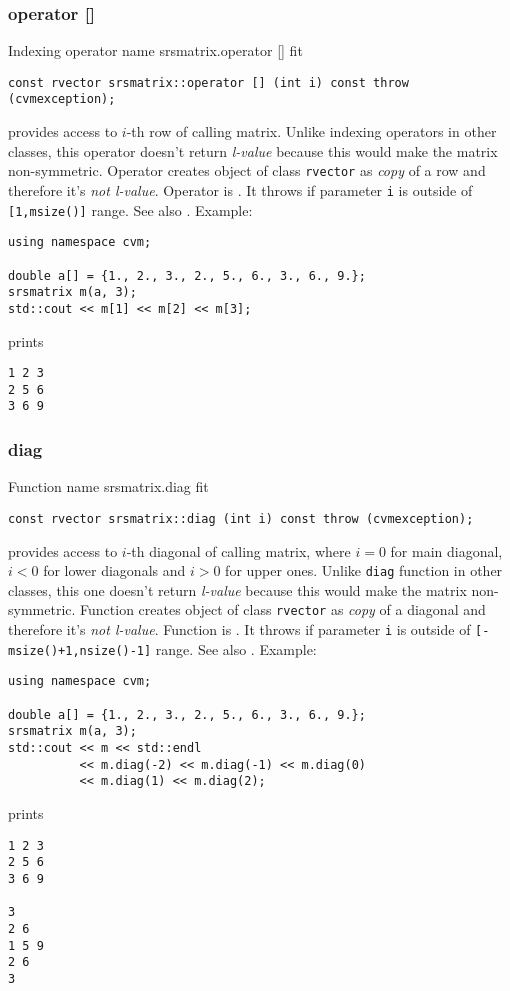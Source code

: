 \subsubsection{operator []}
Indexing operator%
\pdfdest name {srsmatrix.operator []} fit
\begin{verbatim}
const rvector srsmatrix::operator [] (int i) const throw (cvmexception);
\end{verbatim}
provides access to \hbox{$i$-th} row of calling matrix.
Unlike indexing operators in other classes,
this operator doesn't return  \emph{l-value}
because this would make the matrix non-symmetric.
Operator creates  object of class \verb"rvector"
as  \emph{copy} of a row and therefore it's
\emph{not  l-value}.
Operator is \Based.
It throws 
if parameter \verb"i" is outside of \verb"[1,msize()]" range.
See also .
Example:
\begin{Verbatim}
using namespace cvm;

double a[] = {1., 2., 3., 2., 5., 6., 3., 6., 9.};
srsmatrix m(a, 3);
std::cout << m[1] << m[2] << m[3];
\end{Verbatim}
prints
\begin{Verbatim}
1 2 3
2 5 6
3 6 9
\end{Verbatim}
\newpage



\subsubsection{diag}
Function%
\pdfdest name {srsmatrix.diag} fit
\begin{verbatim}
const rvector srsmatrix::diag (int i) const throw (cvmexception);
\end{verbatim}
provides access to \hbox{$i$-th} diagonal of calling matrix,
where $i=0$ for main diagonal, $i<0$ for lower diagonals 
and $i>0$ for upper ones.
Unlike \verb"diag" function in other classes,
this one doesn't return  \emph{l-value}
because this would make the matrix non-symmetric.
Function creates  object of class \verb"rvector"
as  \emph{copy} of a diagonal and therefore it's
\emph{not  l-value}.
Function is \Based.
It throws 
if parameter \verb"i" is outside of 
\verb"[-msize()+1,nsize()-1]" range.
See also .
Example:
\begin{Verbatim}
using namespace cvm;

double a[] = {1., 2., 3., 2., 5., 6., 3., 6., 9.};
srsmatrix m(a, 3);
std::cout << m << std::endl
          << m.diag(-2) << m.diag(-1) << m.diag(0)
          << m.diag(1) << m.diag(2);
\end{Verbatim}
prints
\begin{Verbatim}
1 2 3
2 5 6
3 6 9

3
2 6
1 5 9
2 6
3
\end{Verbatim}
\newpage



